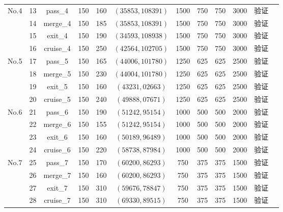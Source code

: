 {\begin{longtable}{X c c c c c c c c c c l}
  \multirow{4}{*}{No.4} 
  & 13 & pass\_4 & 150 & 160 & $(35853,108391)$ & 1500 & 750 & 750 & 3000 & 验证 \\
  & 14 & merge\_4 & 150 & 185 & $(35853,108391)$ & 1500 & 750 & 750 & 3000 & 验证 \\
  & 15 & exit\_4 & 150 & 190 & $(34593,108938)$ & 1500 & 750 & 750 & 3000 & 验证 \\
  & 16 & cruise\_4 & 150 & 250 & $(42564,102705)$ & 1500 & 750 & 750 & 3000 & 验证 \\
  \midrule

  \multirow{4}{*}{No.5} 
  & 17 & pass\_5 & 150 & 165 & $(44006,101780)$ & 1250 & 625 & 625 & 2500 & 验证 \\
  & 18 & merge\_5 & 150 & 230 & $(44004,101780)$ & 1250 & 625 & 625 & 2500 & 验证 \\
  & 19 & exit\_5 & 150 & 160 & $(43231,02663)$ & 1250 & 625 & 625 & 2500 & 验证 \\
  & 20 & cruise\_5 & 150 & 240 & $(49888,07671)$ & 1250 & 625 & 625 & 2500 & 验证 \\
  \midrule

  \multirow{4}{*}{No.6} 
  & 21 & pass\_6 & 150 & 190 & $(51242,95154)$ & 1000 & 500 & 500 & 2000 & 验证 \\
  & 22 & merge\_6 & 150 & 155 & $(51242,95154)$ & 1000 & 500 & 500 & 2000 & 验证 \\
  & 23 & exit\_6 & 150 & 160 & $(50189,96489)$ & 1000 & 500 & 500 & 2000 & 验证 \\
  & 24 & cruise\_6 & 150 & 220 & $(58738,87984)$ & 1000 & 500 & 500 & 2000 & 验证 \\
  \midrule

  \multirow{4}{*}{No.7} 
  & 25 & pass\_7 & 150 & 170 & $(60200,86293)$ & 750 & 375 & 375 & 1500 & 验证 \\
  & 26 & merge\_7 & 150 & 160 & $(60200,86293)$ & 750 & 375 & 375 & 1500 & 验证 \\
  & 27 & exit\_7 & 150 & 310 & $(59676,78847)$ & 750 & 375 & 375 & 1500 & 验证 \\
  & 28 & cruise\_7 & 150 & 310 & $(69330,89515)$ & 750 & 375 & 375 & 1500 & 验证 \\
  \midrule


\end{longtable}}
